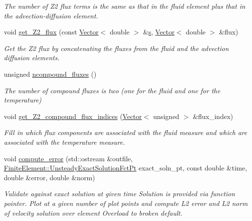 \begin{DoxyCompactItemize}
\begin{DoxyCompactList}\small\item\em The number of Z2 flux terms is the same as that in the fluid element plus that in the advection-\/diffusion element. \end{DoxyCompactList}\item 
void \hyperlink{classoomph_1_1RefineableBuoyantQCrouzeixRaviartElement_a1b78fb6b311b89cff1b57fcaacd924d7}{get\+\_\+\+Z2\+\_\+flux} (const \hyperlink{classoomph_1_1Vector}{Vector}$<$ double $>$ \&\hyperlink{cfortran_8h_ab7123126e4885ef647dd9c6e3807a21c}{s}, \hyperlink{classoomph_1_1Vector}{Vector}$<$ double $>$ \&flux)
\begin{DoxyCompactList}\small\item\em Get the Z2 flux by concatenating the fluxes from the fluid and the advection diffusion elements. \end{DoxyCompactList}\item 
unsigned \hyperlink{classoomph_1_1RefineableBuoyantQCrouzeixRaviartElement_a395397240c5745ad7ed66ce6f66b5d99}{ncompound\+\_\+fluxes} ()
\begin{DoxyCompactList}\small\item\em The number of compound fluxes is two (one for the fluid and one for the temperature) \end{DoxyCompactList}\item 
void \hyperlink{classoomph_1_1RefineableBuoyantQCrouzeixRaviartElement_ac8b5c8d8df0dc6d7af67570c609f591b}{get\+\_\+\+Z2\+\_\+compound\+\_\+flux\+\_\+indices} (\hyperlink{classoomph_1_1Vector}{Vector}$<$ unsigned $>$ \&flux\+\_\+index)
\begin{DoxyCompactList}\small\item\em Fill in which flux components are associated with the fluid measure and which are associated with the temperature measure. \end{DoxyCompactList}\item 
void \hyperlink{classoomph_1_1RefineableBuoyantQCrouzeixRaviartElement_ad239e9a0ebe88136d68e1521fc51e0bb}{compute\+\_\+error} (std\+::ostream \&outfile, \hyperlink{classoomph_1_1FiniteElement_ad4ecf2b61b158a4b4d351a60d23c633e}{Finite\+Element\+::\+Unsteady\+Exact\+Solution\+Fct\+Pt} exact\+\_\+soln\+\_\+pt, const double \&time, double \&error, double \&norm)
\begin{DoxyCompactList}\small\item\em Validate against exact solution at given time Solution is provided via function pointer. Plot at a given number of plot points and compute L2 error and L2 norm of velocity solution over element Overload to broken default. \end{DoxyCompactList}\item 

\end{DoxyCompactItemize}

